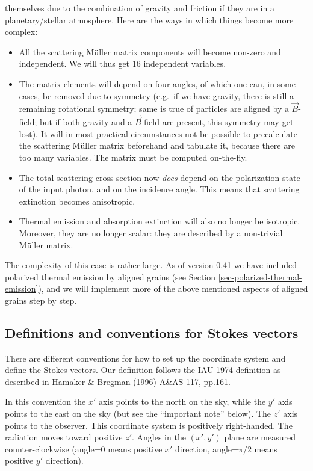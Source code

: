 \documentclass{report}
\begin{document}
\begin{enumerate}
  themselves due to the combination of gravity and friction if they are in a
  planetary/stellar atmosphere. Here are the ways in which things become
  more complex:
  \begin{itemize}
  \item All the scattering M\"uller matrix components will become
    non-zero and independent. We will thus get 16 independent variables.
  \item The matrix elements will depend on four angles, of which one can,
    in some cases, be removed due to symmetry (e.g.\ if we have gravity,
    there is still a remaining rotational symmetry; same is true of
    particles are aligned by a $\vec B$-field; but if both gravity and a
    $\vec B$-field are present, this symmetry may get lost). It will in
    most practical circumstances not be possible to precalculate the
    scattering M\"uller matrix beforehand and tabulate it, because there
    are too many variables. The matrix must be computed on-the-fly.
  \item The total scattering cross section now {\em does} depend on the
    polarization state of the input photon, and on the incidence angle.
    This means that scattering extinction becomes anisotropic.
  \item Thermal emission and absorption extinction will also no longer
    be isotropic. Moreover, they are no longer scalar: they are described
    by a non-trivial M\"uller matrix.
  \end{itemize}
  The complexity of this case is rather large. As of version 0.41 we
  have included polarized thermal emission by aligned grains (see
  Section \ref{sec-polarized-thermal-emission}), and we will
  implement more of the above mentioned aspects of aligned grains
  step by step.
\end{enumerate}
 
\subsection{Definitions and conventions for Stokes vectors}
\label{sec-definitions-stokes}
%
There are different conventions for how to set up the coordinate system
and define the Stokes vectors. Our definition follows the IAU 1974 
definition as described in Hamaker \& Bregman (1996) A\&AS 117, pp.161.

In this convention the $x'$ axis points to the north on the sky, while the
$y'$ axis points to the east on the sky (but see the ``important note''
below). The $z'$ axis points to the observer. This coordinate system is
positively right-handed. The radiation moves toward positive $z'$. Angles in
the $(x',y')$ plane are measured counter-clockwise (angle=0 means positive
$x'$ direction, angle=$\pi$/2 means positive $y'$ direction).
\end{document}
